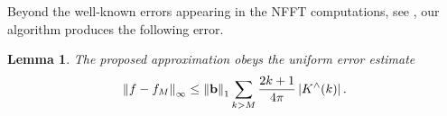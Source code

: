 \documentclass[11pt,a4paper,twoside,bibtotoc]{scrartcl}
\theoremstyle{plain}
\newtheorem{lemma}[theorem]{Lemma}
\theoremstyle{definition}
\theoremstyle{remark}
\newcommand{\abs}[1]{\ensuremath{\left\vert#1\right\vert}}
\newcommand{\fun}[2]{\ensuremath{#1{\hspace{-0.4ex}}\left(#2\right)}}
\newcommand{\mb}[1]{\mathbf{#1}}
\newcommand{\V}[1]{\mb{#1}}
\numberwithin{equation}{section}
\numberwithin{table}{section}
\numberwithin{figure}{section}
\begin{document}
Beyond the well-known errors appearing in the NFFT computations, see
\cite{postta01}, our algorithm produces the following error.
\begin{lemma}\label{lemma:error}
  The proposed approximation obeys the uniform error estimate
  \begin{equation*}
    \left\|f - f_{M}\right\|_{\infty} \le \left\|\V{b}\right\|_1 \sum_{k>M}
    \frac{2k+1}{4\pi} \abs{\fun{K^{\wedge}}{k}}.
  \end{equation*}
\end{lemma}
\end{document}
